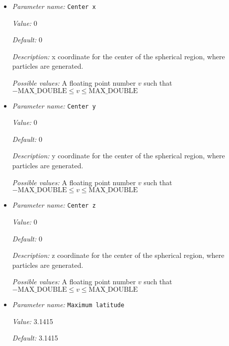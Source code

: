 \begin{itemize}
\item {\it Parameter name:} {\tt Center x}
\label{parameters:Postprocess/Particles/Generator/Uniform radial/Center x}


{\it Value:} 0


{\it Default:} 0


{\it Description:} x coordinate for the center of the spherical region, where particles are generated.


{\it Possible values:} A floating point number $v$ such that $-\text{MAX\_DOUBLE} \leq v \leq \text{MAX\_DOUBLE}$
\item {\it Parameter name:} {\tt Center y}
\label{parameters:Postprocess/Particles/Generator/Uniform radial/Center y}


{\it Value:} 0


{\it Default:} 0


{\it Description:} y coordinate for the center of the spherical region, where particles are generated.


{\it Possible values:} A floating point number $v$ such that $-\text{MAX\_DOUBLE} \leq v \leq \text{MAX\_DOUBLE}$
\item {\it Parameter name:} {\tt Center z}
\label{parameters:Postprocess/Particles/Generator/Uniform radial/Center z}


{\it Value:} 0


{\it Default:} 0


{\it Description:} z coordinate for the center of the spherical region, where particles are generated.


{\it Possible values:} A floating point number $v$ such that $-\text{MAX\_DOUBLE} \leq v \leq \text{MAX\_DOUBLE}$
\item {\it Parameter name:} {\tt Maximum latitude}
\label{parameters:Postprocess/Particles/Generator/Uniform radial/Maximum latitude}


{\it Value:} 3.1415


{\it Default:} 3.1415



\end{itemize}
